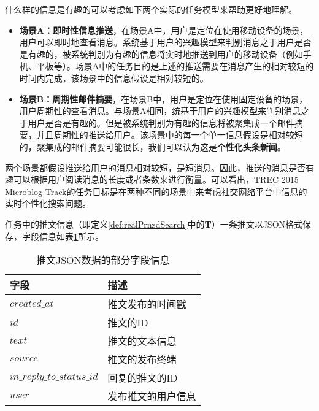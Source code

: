 什么样的信息是有趣的可以考虑如下两个实际的任务模型来帮助更好地理解。
\begin{itemize}
  \item \textbf{场景A：即时性信息推送}，在场景A中，用户是定位在使用移动设备的场景，用户可以即时地查看消息。系统基于用户的兴趣模型来判别消息之于用户是否是有趣的，被系统判别为有趣的信息将实时地推送到用户的移动设备（例如手机、平板等）。场景A中的任务目的是上述的推送需要在消息产生的相对较短的时间内完成，该场景中的信息假设是相对较短的。
  \item \textbf{场景B：周期性邮件摘要}，在场景B中，用户是定位在使用固定设备的场景，用户周期性的查看消息。与场景A相同，统基于用户的兴趣模型来判别消息之于用户是否是有趣的。但是被系统判别为有趣的信息将被聚集成一个邮件摘要，并且周期性的推送给用户。该场景中的每一个单一信息假设是相对较短的，聚集成的邮件摘要可能很长，我们可以认为这是\textbf{个性化头条新闻}。
\end{itemize}

两个场景都假设推送给用户的消息相对较短，是短消息。因此，推送的消息是否有趣可以根据用户阅读消息的长度或者条数来进行衡量。可以看出，TREC 2015 Microblog Track的任务目标是在两种不同的场景中来考虑社交网络平台中信息的实时个性化搜索问题。

任务中的推文信息（即定义\ref{def:realPrnzdSearch}中的\textbf{T}）一条推文以JSON格式保存，字段信息如表\ref{tab:tweetJSON}所示。
\begin{table}[!htbp]
\centering
\caption{推文JSON数据的部分字段信息}
\begin{tabular}{|p{4cm}|p{7cm}|}
\hline
\textbf{字段} & \textbf{描述} \\
\hline
$created\_at$ & 推文发布的时间戳\\
\hline
$id$ & 推文的ID\\
\hline
$text$ & 推文的文本信息\\
\hline
$source$ & 推文的发布终端\\
\hline
$in\_reply\_to\_status\_id$ & 回复的推文的ID\\
\hline
$user$ & 发布推文的用户信息\\
\hline
\end{tabular}
\label{tab:tweetJSON}
\end{table}

